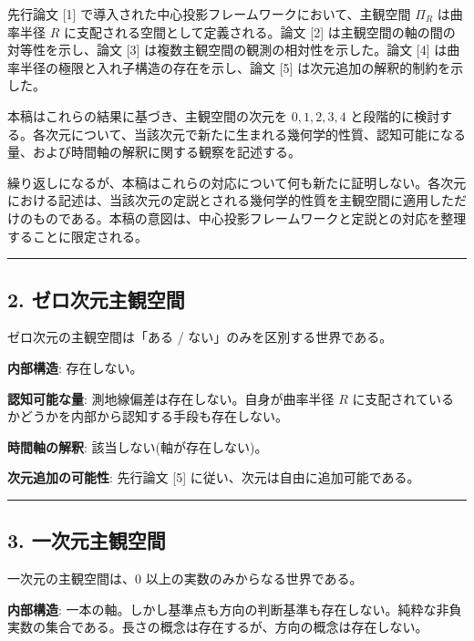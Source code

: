\documentclass[a4paper,11pt]{ltjsarticle}
\theoremstyle{definition}
\begin{document}
先行論文 {[}1{]} で導入された中心投影フレームワークにおいて、主観空間 \(\Pi_R\) は曲率半径 \(R\) に支配される空間として定義される。論文 {[}2{]} は主観空間の軸の間の対等性を示し、論文 {[}3{]} は複数主観空間の観測の相対性を示した。論文 {[}4{]} は曲率半径の極限と入れ子構造の存在を示し、論文 {[}5{]} は次元追加の解釈的制約を示した。

本稿はこれらの結果に基づき、主観空間の次元を \(0, 1, 2, 3, 4\) と段階的に検討する。各次元について、当該次元で新たに生まれる幾何学的性質、認知可能になる量、および時間軸の解釈に関する観察を記述する。

繰り返しになるが、本稿はこれらの対応について何も新たに証明しない。各次元における記述は、当該次元の定説とされる幾何学的性質を主観空間に適用しただけのものである。本稿の意図は、中心投影フレームワークと定説との対応を整理することに限定される。

\begin{center}\rule{0.5\linewidth}{0.5pt}\end{center}

\subsection{2. ゼロ次元主観空間}\label{ux30bcux30edux6b21ux5143ux4e3bux89b3ux7a7aux9593}

ゼロ次元の主観空間は「ある / ない」のみを区別する世界である。

\textbf{内部構造}: 存在しない。

\textbf{認知可能な量}: 測地線偏差は存在しない。自身が曲率半径 \(R\) に支配されているかどうかを内部から認知する手段も存在しない。

\textbf{時間軸の解釈}: 該当しない(軸が存在しない)。

\textbf{次元追加の可能性}: 先行論文 {[}5{]} に従い、次元は自由に追加可能である。

\begin{center}\rule{0.5\linewidth}{0.5pt}\end{center}

\subsection{3. 一次元主観空間}\label{ux4e00ux6b21ux5143ux4e3bux89b3ux7a7aux9593}

一次元の主観空間は、\(0\) 以上の実数のみからなる世界である。

\textbf{内部構造}: 一本の軸。しかし基準点も方向の判断基準も存在しない。純粋な非負実数の集合である。長さの概念は存在するが、方向の概念は存在しない。
\end{document}

